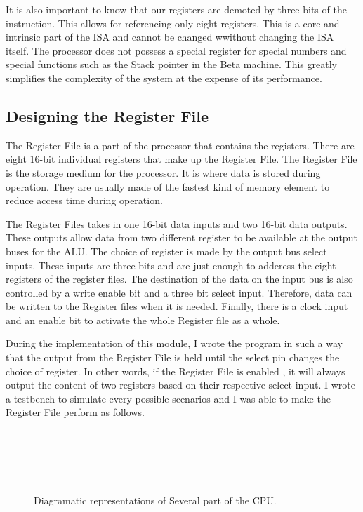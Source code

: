 It is also important to know that our registers are demoted by three bits of the instruction. This allows for referencing only eight registers. This is a core and intrinsic part of the ISA and cannot be changed wwithout changing the ISA itself.
The processor does not possess a special register for special numbers and special functions such as the Stack pointer in the Beta machine. This greatly simplifies the complexity of the system at the expense of its performance.  

\subsection{Designing the Register File}
The Register File is a part of the processor that contains the registers. There are eight 16-bit individual registers that make up the Register File. The Register File is the storage medium for the processor. It is where data is stored during operation. They are usually made of the fastest kind of memory element to reduce access time during operation. 

The Register Files takes in one 16-bit data inputs and two 16-bit data outputs. These outputs allow data from two different register to be available at the output buses for the ALU. The choice of register is made by the output bus select inputs. These inputs are three bits and are just enough to adderess the eight registers of the register files. The destination of the data on the input bus is also controlled by a write enable bit and a three bit select input. Therefore, data can be written to the Register files when it is needed. Finally, there is a clock input and an enable bit to activate the whole Register file as a whole.

During the implementation of this module, I wrote the program in such a way that the output from the Register File is held until the select pin changes the choice of register. In other words, if the Register File is enabled , it will always output the content of two registers based on their respective select input. I wrote a testbench to simulate every possible scenarios and I was able to make the Register File perform as follows.


\begin{figure}[p]
\\
\\

\\
\\
\caption{Diagramatic representations of Several part of the CPU.}
\label{fig:pc_alu_dec}
\end{figure}

